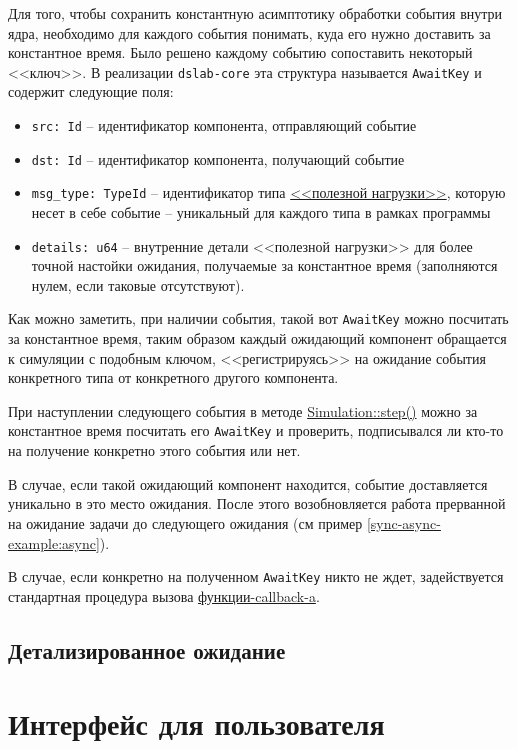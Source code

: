 Для того, чтобы сохранить константную асимптотику обработки события внутри ядра, необходимо для каждого события понимать, куда его нужно доставить за константное время. Было решено каждому событию сопоставить некоторый <<ключ>>. В реализации \texttt{dslab-core} эта структура называется \texttt{AwaitKey} и содержит следующие поля: 
\begin{itemize}
    \item \texttt{src: Id} -- идентификатор компонента, отправляющий событие
    \item \texttt{dst: Id} -- идентификатор компонента, получающий событие
    \item \texttt{msg\_type: TypeId} -- идентификатор типа \hyperref[Event:payload]{<<полезной нагрузки>>}, которую несет в себе событие -- уникальный для каждого типа в рамках программы 
    \item \texttt{details: u64} -- внутренние детали <<полезной нагрузки>> для более точной настойки ожидания, получаемые за константное время (заполняются нулем, если таковые отсутствуют).
\end{itemize}  

Как можно заметить, при наличии события, такой вот \texttt{AwaitKey} можно посчитать за константное время, таким образом каждый ожидающий компонент обращается к симуляции с подобным ключом, <<регистрируясь>> на ожидание события конкретного типа от конкретного другого компонента.

При наступлении следующего события в методе \hyperref[Simulation::step]{Simulation::step()} можно за константное время посчитать его \texttt{AwaitKey} и проверить, подписывался ли кто-то на получение конкретно этого события или нет. 

В случае, если такой ожидающий компонент находится, событие доставляется уникально в это место ожидания. После этого возобновляется работа прерванной на ожидание задачи до следующего ожидания (см пример \ref{sync-async-example:async}).

В случае, если конкретно на полученном \texttt{AwaitKey} никто не ждет, задействуется стандартная процедура вызова \hyperref[fnon]{функции-callback-a}.

\subsection{Детализированное ожидание}

\section{Интерфейс для пользователя} 

